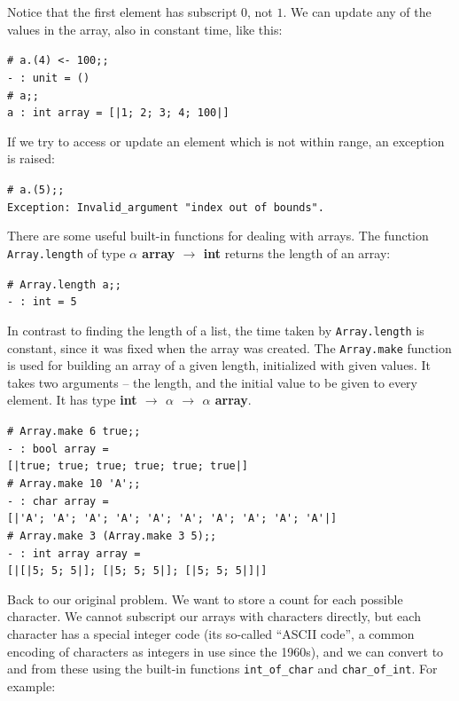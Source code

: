 \documentclass[]{book}
\newcommand{\smspace}{\vspace{4mm}}
\begin{document}
\noindent Notice that the first element has subscript $0$, not $1$. We can update any of the values in the array, also in constant time, like this:

\smspace
\noindent\verb!# a.(4) <- 100;;!\\
\noindent\verb!- : unit = ()!\\
\noindent\verb!# a;;!\\
\noindent\verb!a : int array = [|1; 2; 3; 4; 100|]!
\smspace

\noindent If we try to access or update an element which is not within range, an exception is raised:

\smspace
\noindent\verb!# a.(5);;!\\
\noindent\verb!Exception: Invalid_argument "index out of bounds".!
\smspace

\noindent There are some useful built-in functions for dealing with arrays. The function \texttt{Array.length} of type \textbf{\textrm{$\alpha$ array $\rightarrow$ int}} returns the length of an array:

\smspace
\noindent\verb!# Array.length a;;!\\
\noindent\verb!- : int = 5!
\smspace

\noindent In contrast to finding the length of a list, the time taken by \texttt{Array.length} is constant, since it was fixed when the array was created. The \texttt{Array.make} function is used for building an array of a given length, initialized with given values. It takes two arguments -- the length, and the initial value to be given to every element. It has type \textrm{\textbf{int $\rightarrow$ $\alpha$ $\rightarrow$ $\alpha$ array}}.

\smspace
\noindent\verb!# Array.make 6 true;;!\\
\noindent\verb!- : bool array =!\\
\noindent\verb![|true; true; true; true; true; true|]!\\
\noindent\verb!# Array.make 10 'A';;!\\
\noindent\verb!- : char array =!\\
\noindent\verb![|'A'; 'A'; 'A'; 'A'; 'A'; 'A'; 'A'; 'A'; 'A'; 'A'|]!\\
\noindent\verb!# Array.make 3 (Array.make 3 5);;!\\
\noindent\verb!- : int array array =!\\
\noindent\verb![|[|5; 5; 5|]; [|5; 5; 5|]; [|5; 5; 5|]|]!
\smspace 

\noindent Back to our original problem. We want to store a count for each possible character. We cannot subscript our arrays with characters directly, but each character has a special integer code (its so-called ``ASCII code'', a common encoding of characters as integers in use since the 1960s), and we can convert to and from these using the built-in functions \texttt{int\_of\_char} and \texttt{char\_of\_int}. For example:
\end{document}
